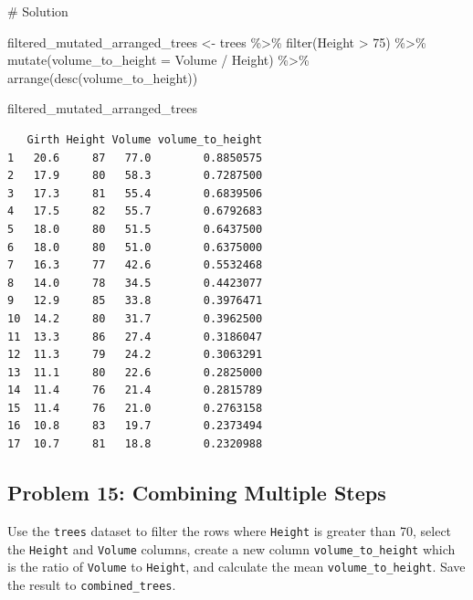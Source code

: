 \documentclass[
  letterpaper,
  DIV=11,
  numbers=noendperiod]{scrreprt}
\newenvironment{Shaded}{\begin{snugshade}}{\end{snugshade}}
\newcommand{\AttributeTok}[1]{\textcolor[rgb]{0.40,0.45,0.13}{#1}}
\newcommand{\CommentTok}[1]{\textcolor[rgb]{0.37,0.37,0.37}{#1}}
\newcommand{\DecValTok}[1]{\textcolor[rgb]{0.68,0.00,0.00}{#1}}
\newcommand{\FunctionTok}[1]{\textcolor[rgb]{0.28,0.35,0.67}{#1}}
\newcommand{\NormalTok}[1]{\textcolor[rgb]{0.00,0.23,0.31}{#1}}
\newcommand{\OtherTok}[1]{\textcolor[rgb]{0.00,0.23,0.31}{#1}}
\newcommand{\SpecialCharTok}[1]{\textcolor[rgb]{0.37,0.37,0.37}{#1}}
\begin{document}
\begin{Shaded}
\begin{Highlighting}[]
\CommentTok{\# Solution}

\NormalTok{filtered\_mutated\_arranged\_trees }\OtherTok{\textless{}{-}}\NormalTok{ trees }\SpecialCharTok{\%\textgreater{}\%}
  \FunctionTok{filter}\NormalTok{(Height }\SpecialCharTok{\textgreater{}} \DecValTok{75}\NormalTok{) }\SpecialCharTok{\%\textgreater{}\%}
  \FunctionTok{mutate}\NormalTok{(}\AttributeTok{volume\_to\_height =}\NormalTok{ Volume }\SpecialCharTok{/}\NormalTok{ Height) }\SpecialCharTok{\%\textgreater{}\%}
  \FunctionTok{arrange}\NormalTok{(}\FunctionTok{desc}\NormalTok{(volume\_to\_height))}

\NormalTok{filtered\_mutated\_arranged\_trees}
\end{Highlighting}
\end{Shaded}

\begin{verbatim}
   Girth Height Volume volume_to_height
1   20.6     87   77.0        0.8850575
2   17.9     80   58.3        0.7287500
3   17.3     81   55.4        0.6839506
4   17.5     82   55.7        0.6792683
5   18.0     80   51.5        0.6437500
6   18.0     80   51.0        0.6375000
7   16.3     77   42.6        0.5532468
8   14.0     78   34.5        0.4423077
9   12.9     85   33.8        0.3976471
10  14.2     80   31.7        0.3962500
11  13.3     86   27.4        0.3186047
12  11.3     79   24.2        0.3063291
13  11.1     80   22.6        0.2825000
14  11.4     76   21.4        0.2815789
15  11.4     76   21.0        0.2763158
16  10.8     83   19.7        0.2373494
17  10.7     81   18.8        0.2320988
\end{verbatim}

\subsection*{Problem 15: Combining Multiple
Steps}\label{problem-15-combining-multiple-steps}

Use the \texttt{trees} dataset to filter the rows where \texttt{Height}
is greater than 70, select the \texttt{Height} and \texttt{Volume}
columns, create a new column \texttt{volume\_to\_height} which is the
ratio of \texttt{Volume} to \texttt{Height}, and calculate the mean
\texttt{volume\_to\_height}. Save the result to
\texttt{combined\_trees}.
\end{document}
